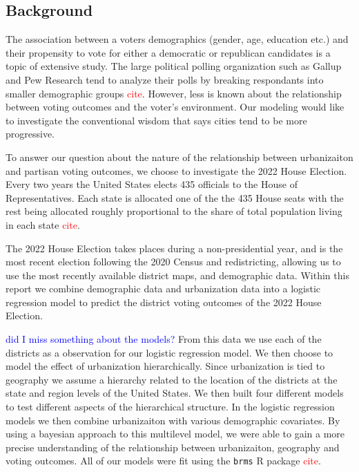\documentclass[12pt]{article}
\newcommand{\red}[1]{\textcolor{red}{#1}}
\newcommand{\blue}[1]{\textcolor{blue}{#1}}
\begin{document}
\subsection*{Background}
The association between a voters demographics (gender, age, education etc.) and their propensity to vote for either a democratic or republican candidates is a topic of extensive study. The large political polling organization such as Gallup and Pew Research tend to analyze their polls by breaking respondants into smaller demographic groups \red{cite}. However, less is known about the relationship between voting outcomes and the voter's environment. Our modeling would like to investigate the conventional wisdom that says cities tend to be more progressive. 

To answer our question about the nature of the relationship between urbanizaiton and partisan voting outcomes, we choose to investigate the 2022 House Election. Every two years the United States elects 435 officials to the House of Representatives. Each state is allocated one of the the 435 House seats with the rest being allocated roughly proportional to the share of total population living in each state \red{cite}. 

The 2022 House Election takes places during a non-presidential year, and is the most recent election following the 2020 Census and redistricting, allowing us to use the most recently available district maps, and demographic data. Within this report we combine demographic data and urbanization data into a logistic regression model to predict the district voting outcomes of the 2022 House Election. 

\blue{did I miss something about the models?}
From this data we use each of the districts as a observation for our logistic regression model. We then choose to model the effect of urbanization hierarchically. Since urbanization is tied to geography we assume a hierarchy related to the location of the districts at the state and region levels of the United States. We then built four different models to test different aspects of the hierarchical structure. In the logistic regression  models we then combine urbanizaiton with various demographic covariates. By using a bayesian approach to this multilevel model, we were able to gain a more precise understanding of the relationship between urbanizaiton, geography and voting outcomes. All of our models were fit using the \texttt{brms} R package \red{cite}. 



\end{document}
